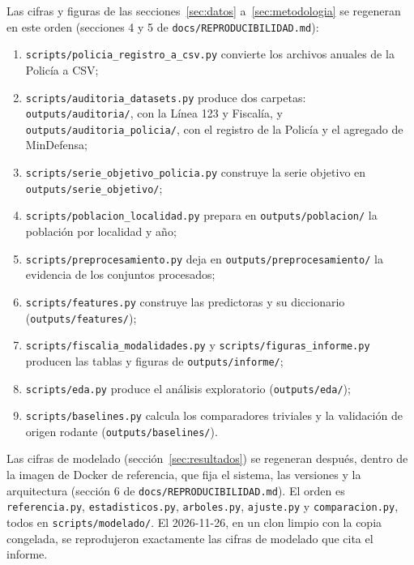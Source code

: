 Las cifras y figuras de las secciones~\ref{sec:datos} a~\ref{sec:metodologia} se regeneran en este orden (secciones 4 y 5 de \texttt{docs/REPRODUCIBILIDAD.md}):
\begin{enumerate}
  \item \texttt{scripts/policia\_\allowbreak{}registro\_\allowbreak{}a\_\allowbreak{}csv.py} convierte los archivos anuales de la Policía a CSV;
  \item \texttt{scripts/\allowbreak{}auditoria\_\allowbreak{}datasets.py} produce dos carpetas: \texttt{outputs/auditoria/}, con la Línea 123 y Fiscalía, y \texttt{outputs/auditoria\_\allowbreak{}policia/}, con el registro de la Policía y el agregado de MinDefensa;
  \item \texttt{scripts/serie\_\allowbreak{}objetivo\_\allowbreak{}policia.py} construye la serie objetivo en \texttt{outputs/serie\_\allowbreak{}objetivo/};
  \item \texttt{scripts/\allowbreak{}poblacion\_\allowbreak{}localidad.py} prepara en \texttt{outputs/\allowbreak{}poblacion/} la población por localidad y año;
  \item \texttt{scripts/\allowbreak{}preprocesamiento.py} deja en \texttt{outputs/\allowbreak{}preprocesamiento/} la evidencia de los conjuntos procesados;
  \item \texttt{scripts/\allowbreak{}features.py} construye las predictoras y su diccionario (\texttt{outputs/features/});
  \item \texttt{scripts/fiscalia\_\allowbreak{}modalidades.py} y \texttt{scripts/figuras\_\allowbreak{}informe.py} producen las tablas y figuras de \texttt{outputs/informe/};
  \item \texttt{scripts/\allowbreak{}eda.py} produce el análisis exploratorio (\texttt{outputs/eda/});
  \item \texttt{scripts/\allowbreak{}baselines.py} calcula los comparadores triviales y la validación de origen rodante (\texttt{outputs/baselines/}).
\end{enumerate}

Las cifras de modelado (sección~\ref{sec:resultados}) se regeneran después, dentro de la imagen de Docker de referencia, que fija el sistema, las versiones y la arquitectura (sección 6 de \texttt{docs/\allowbreak{}REPRODUCIBILIDAD.md}). El orden es \texttt{referencia.py}, \texttt{estadisticos.py}, \texttt{arboles.py}, \texttt{ajuste.py} y \texttt{comparacion.py}, todos en \texttt{scripts/\allowbreak{}modelado/}. El 2026-11-26, en un clon limpio con la copia congelada, se reprodujeron exactamente las cifras de modelado que cita el informe.

